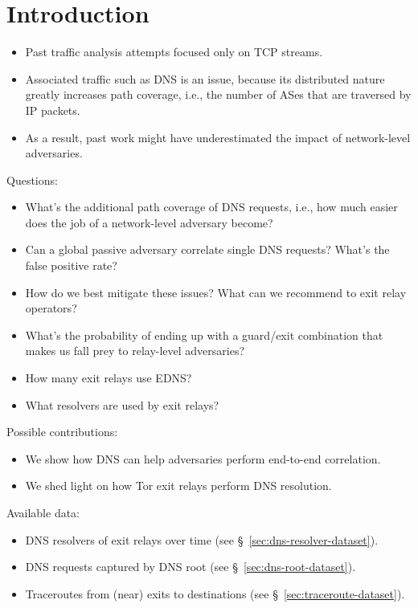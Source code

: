 \section{Introduction}
\label{sec:introduction}

\begin{itemize}
	\item Past traffic analysis attempts focused only on TCP streams.
	\item Associated traffic such as DNS is an issue, because its distributed
		nature greatly increases path coverage, i.e., the number of ASes that
		are traversed by IP packets.
	\item As a result, past work might have underestimated the impact of
		network-level adversaries.
\end{itemize}

Questions:
\begin{itemize}
	\item What's the additional path coverage of DNS requests, i.e., how much
		easier does the job of a network-level adversary become?
	\item Can a global passive adversary correlate single DNS requests?  What's
		the false positive rate?
	\item How do we best mitigate these issues?  What can we recommend to exit
		relay operators?
	\item What's the probability of ending up with a guard/exit combination that
		makes us fall prey to relay-level adversaries?
	\item How many exit relays use EDNS?
	\item What resolvers are used by exit relays?
\end{itemize}

Possible contributions:
\begin{itemize}
	\item We show how DNS can help adversaries perform end-to-end correlation.
	\item We shed light on how Tor exit relays perform DNS resolution.
\end{itemize}

Available data:
\begin{itemize}
	\item DNS resolvers of exit relays over time (see \S~\ref{sec:dns-resolver-dataset}).
	\item DNS requests captured by DNS root (see \S~\ref{sec:dns-root-dataset}).
	\item Traceroutes from (near) exits to destinations (see \S~\ref{sec:traceroute-dataset}).
\end{itemize}


